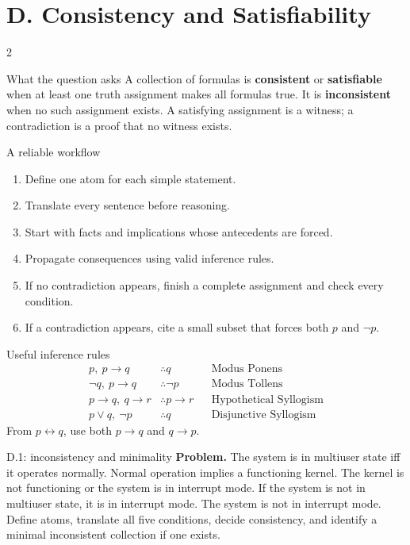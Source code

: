 \documentclass[10pt]{article}
\newcommand{\term}[1]{\textbf{\color{CoreNavy}#1}}
\begin{document}
\bigskip
\section*{D. Consistency and Satisfiability}
\begin{multicols}{2}
\begin{definitionbox}{What the question asks}
A collection of formulas is \term{consistent} or \term{satisfiable} when at
least one truth assignment makes all formulas true. It is
\term{inconsistent} when no such assignment exists. A satisfying assignment
is a witness; a contradiction is a proof that no witness exists.
\end{definitionbox}

\begin{methodbox}{A reliable workflow}
\begin{enumerate}
\item Define one atom for each simple statement.
\item Translate every sentence before reasoning.
\item Start with facts and implications whose antecedents are forced.
\item Propagate consequences using valid inference rules.
\item If no contradiction appears, finish a complete assignment and check
every condition.
\item If a contradiction appears, cite a small subset that forces both $p$
and $\neg p$.
\end{enumerate}
\end{methodbox}

\begin{definitionbox}{Useful inference rules}
\begin{align*}
p,\ p\to q&\therefore q &&\text{Modus Ponens}\tag{MP}\\
\neg q,\ p\to q&\therefore\neg p &&\text{Modus Tollens}\tag{MT}\\
p\to q,\ q\to r&\therefore p\to r &&\text{Hypothetical Syllogism}\\
p\lor q,\ \neg p&\therefore q &&\text{Disjunctive Syllogism}
\end{align*}
From $p\leftrightarrow q$, use both $p\to q$ and $q\to p$.
\end{definitionbox}

\begin{workedbox}{D.1: inconsistency and minimality}
\textbf{Problem.} The system is in multiuser state iff it operates normally.
Normal operation implies a functioning kernel. The kernel is not functioning
or the system is in interrupt mode. If the system is not in multiuser state,
it is in interrupt mode. The system is not in interrupt mode. Define atoms,
translate all five conditions, decide consistency, and identify a minimal
inconsistent collection if one exists.


\end{workedbox}
\end{multicols}
\end{document}
